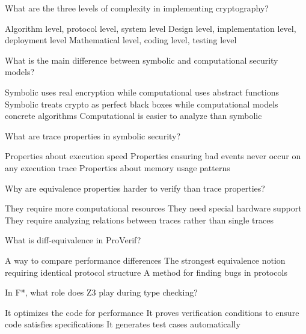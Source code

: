 \documentclass[10pt,a4paper,american]{exam}
\begin{document}
\begin{questions}
	\question What are the three levels of complexity in implementing cryptography?
	\begin{randomizechoices}
		\choice Algorithm level, protocol level, system level
		\CorrectChoice Design level, implementation level, deployment level
		\choice Mathematical level, coding level, testing level
	\end{randomizechoices}

	\question What is the main difference between symbolic and computational security models?
	\begin{randomizechoices}
		\choice Symbolic uses real encryption while computational uses abstract functions
		\CorrectChoice Symbolic treats crypto as perfect black boxes while computational models concrete algorithms
		\choice Computational is easier to analyze than symbolic
	\end{randomizechoices}

	\question What are trace properties in symbolic security?
	\begin{randomizechoices}
		\choice Properties about execution speed
		\CorrectChoice Properties ensuring bad events never occur on any execution trace
		\choice Properties about memory usage patterns
	\end{randomizechoices}

	\question Why are equivalence properties harder to verify than trace properties?
	\begin{randomizechoices}
		\choice They require more computational resources
		\choice They need special hardware support
		\CorrectChoice They require analyzing relations between traces rather than single traces
	\end{randomizechoices}

	\question What is diff-equivalence in ProVerif?
	\begin{randomizechoices}
		\choice A way to compare performance differences
		\CorrectChoice The strongest equivalence notion requiring identical protocol structure
		\choice A method for finding bugs in protocols
	\end{randomizechoices}

	\question In F*, what role does Z3 play during type checking?
	\begin{randomizechoices}
		\choice It optimizes the code for performance
		\CorrectChoice It proves verification conditions to ensure code satisfies specifications
		\choice It generates test cases automatically
	\end{randomizechoices}


\end{questions}
\end{document}
